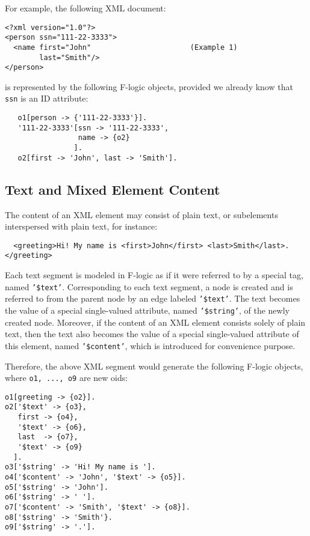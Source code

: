 For example, the following XML document:

\begin{verbatim}
<?xml version="1.0"?>
<person ssn="111-22-3333">
  <name first="John"                       (Example 1)
        last="Smith"/>
</person>
\end{verbatim}
is represented by the following F-logic objects, provided we already
know that {\tt ssn}  is an ID attribute:
\begin{verbatim}
   o1[person -> {'111-22-3333'}].
   '111-22-3333'[ssn -> '111-22-3333',
                 name -> {o2}
                ].
   o2[first -> 'John', last -> 'Smith'].
\end{verbatim}


\subsection{Text and Mixed Element Content}

The content of an XML element may consist of plain text, or
subelements interspersed with plain text, for instance:

\begin{verbatim}
  <greeting>Hi! My name is <first>John</first> <last>Smith</last>.</greeting> 
\end{verbatim}

Each text segment is modeled in F-logic as if it were referred to by a
special tag, named {\tt '\$text'}.  Corresponding to each text segment, a node
is created and is referred to from the parent node by an edge labeled
{\tt '\$text'}. The text becomes the value of a special single-valued
attribute, named {\tt '\$string'},  of the newly created node. Moreover, if the
content of an XML element consists solely of plain text, then the text
also becomes the value of a special single-valued attribute of this
element, named {\tt '\$content'},  which is introduced for convenience purpose.

Therefore, the above XML segment would generate the following F-logic
objects, where {\tt o1, ..., o9}   are new oids:

\begin{verbatim}
o1[greeting -> {o2}].
o2['$text' -> {o3},
   first -> {o4},
   '$text' -> {o6},
   last  -> {o7},
   '$text' -> {o9}
  ].
o3['$string' -> 'Hi! My name is '].
o4['$content' -> 'John', '$text' -> {o5}].
o5['$string' -> 'John'].
o6['$string' -> ' '].
o7['$content' -> 'Smith', '$text' -> {o8}].
o8['$string' -> 'Smith'}.
o9['$string' -> '.'].
\end{verbatim}

